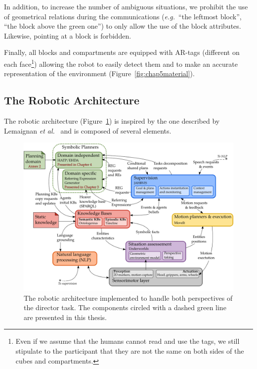 \documentclass[a4paper,11pt,twoside]{StyleThese}
\begin{document}
In addition, to increase the number of ambiguous situations, we prohibit the use of geometrical relations during the communications (\textit{e.g.}~``the leftmost block'', ``the block above the green one'') to only allow the use of the block attributes. Likewise, pointing at a block is forbidden.

Finally, all blocks and compartments are equipped with AR-tags (different on each face\footnote{Even if we assume that the humans cannot read and use the tags, we still stipulate to the participant that they are not the same on both sides of the cubes and compartments.}) allowing the robot to easily detect them and to make an accurate representation of the environment (Figure~\ref{fig:chap5material}).

\subsection{The Robotic Architecture}
The robotic architecture (Figure~\ref{fig:chap5dtarchi}) is inspired by the one described by Lemaignan \textit{et al.}~\cite{lemaignan2017artificial} and is composed of several elements.

\begin{figure}[hbtp]
\centering
\includegraphics[width=\textwidth]{figures/chapter5/architecture.png}
\caption{The robotic architecture implemented to handle both perspectives of the director task. The components circled with a dashed green line are presented in this thesis.}
\label{fig:chap5dtarchi}
\end{figure}
\end{document}
